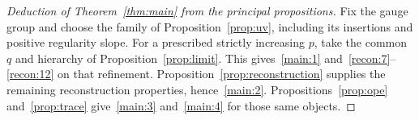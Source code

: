 
\begin{proof}[Deduction of Theorem~\ref{thm:main} from the principal propositions]
Fix the gauge group and choose the family of Proposition~\ref{prop:uv}, including its insertions and positive regularity slope.
For a prescribed strictly increasing $p$, take the common $q$ and hierarchy of Proposition~\ref{prop:limit}.
This gives~\ref{main:1} and~\ref{recon:7}--\ref{recon:12} on that refinement.
Proposition~\ref{prop:reconstruction} supplies the remaining reconstruction properties, hence~\ref{main:2}.
Propositions~\ref{prop:ope} and~\ref{prop:trace} give~\ref{main:3} and~\ref{main:4} for those same objects.
\end{proof}

